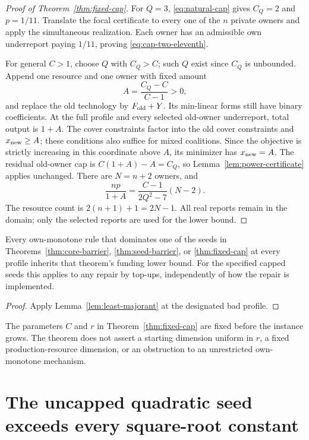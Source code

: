 \begin{proof}[Proof of Theorem~\ref{thm:fixed-cap}]
For $Q=3$, \eqref{eq:natural-cap} gives $C_Q=2$ and $p=1/11$.
Translate the focal certificate to every one of the $n$ private owners
and apply the simultaneous realization.  Each owner has an admissible
own underreport paying $1/11$, proving \eqref{eq:cap-two-eleventh}.

For general $C>1$, choose $Q$ with $C_Q>C$; such $Q$ exist since
$C_Q$ is unbounded.  Append one resource and one owner with fixed amount
\[
 A=\frac{C_Q-C}{C-1}>0,
\]
and replace the old technology by $F_{\rm old}+Y$.  Its min-linear forms
still have binary coefficients.  At the full profile and every selected
old-owner underreport, total output is $1+A$.  The cover constraints
factor into the old cover constraints and $x_{\rm new}\ge A$; these
conditions also suffice for mixed coalitions.  Since the objective is
strictly increasing in this coordinate above $A$, its minimizer has
$x_{\rm new}=A$.  The residual old-owner cap is
$C(1+A)-A=C_Q$, so Lemma~\ref{lem:power-certificate} applies unchanged.
There are $N=n+2$ owners, and
\[
 \frac{np}{1+A}
 =\frac{C-1}{2Q^2-7}(N-2).
\]
The resource count is $2(n+1)+1=2N-1$.  All real reports remain in the
domain; only the selected reports are used for the lower bound.
\end{proof}

\begin{corollary}
\label{cor:majorant-barrier}
Every own-monotone rule that dominates one of the seeds in
Theorems~\ref{thm:core-barrier}, \ref{thm:seed-barrier}, or
\ref{thm:fixed-cap} at every profile inherits that theorem's funding lower
bound.  For the specified capped seeds this applies to any repair by
top-ups, independently of how the repair is implemented.
\end{corollary}
\begin{proof}
Apply Lemma~\ref{lem:least-majorant} at the designated bad profile.
\end{proof}

The parameters $C$ and $r$ in Theorem~\ref{thm:fixed-cap} are fixed before
the instance grows.  The theorem does not assert a starting dimension
uniform in $r$, a fixed production-resource dimension, or an obstruction
to an unrestricted own-monotone mechanism.

\section{The uncapped quadratic seed exceeds every square-root constant}
\label{sec:uncapped}

